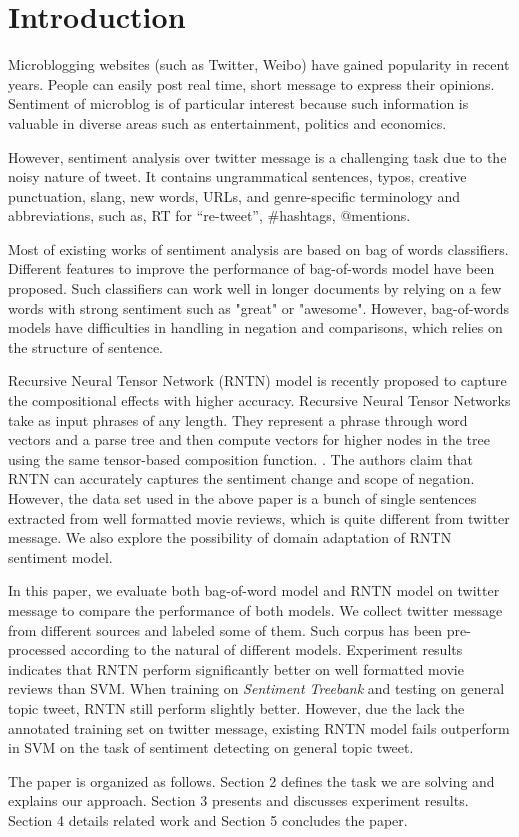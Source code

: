 \section{Introduction}

Microblogging websites (such as Twitter, Weibo) have gained popularity in recent years. People can easily post real time, short message to express their opinions. 
Sentiment of microblog is of particular interest because such information is valuable in diverse areas such as entertainment, politics and economics.

However, sentiment analysis over twitter message is a challenging task due to the noisy nature of tweet. 
It contains ungrammatical sentences, typos, creative punctuation, slang, new words, URLs, and genre-specific terminology and abbreviations, such as, RT for “re-tweet”, \#hashtags, @mentions. 

Most of existing works of sentiment analysis are based on bag of words classifiers. Different features to improve the performance of bag-of-words model have been proposed\cite{Agarwal:2011}. Such classifiers can work well in longer documents by relying on a few words with strong sentiment such as "great" or "awesome". However, bag-of-words models have difficulties in handling in negation and comparisons, which relies on the structure of sentence. 

Recursive Neural Tensor Network (RNTN) model is recently proposed to capture the compositional effects with higher accuracy. Recursive Neural Tensor Networks take as input phrases of any length. They represent a phrase through word vectors and a parse tree and then compute vectors for higher nodes in the tree using the same tensor-based composition function. \cite{Socher:2013}. The authors claim that RNTN can accurately captures the sentiment change and scope of negation. However, the data set used in the above paper is a bunch of single sentences extracted from well formatted movie reviews, which is quite different from twitter message. We also explore the possibility of domain adaptation of RNTN sentiment model. 

In this paper, we evaluate both bag-of-word model and RNTN model on twitter message to compare the performance of both models. We collect twitter message from different sources and labeled some of them. Such corpus has been pre-processed according to the natural of different models. Experiment results indicates that RNTN perform significantly better on well formatted movie reviews than SVM. When training on \textit{Sentiment Treebank} and testing on general topic tweet, RNTN still perform slightly better. However, due the lack the annotated training set on twitter message, existing RNTN model fails outperform in SVM on the task of sentiment detecting on general topic tweet. 


The paper is organized as follows. Section 2 defines the task we are solving and explains our approach. 
Section 3 presents and discusses experiment results. Section 4 details related work and Section 5 concludes the paper.
